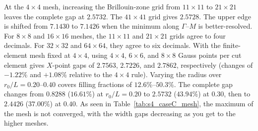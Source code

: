 At the $4\times4$ mesh, increasing the Brillouin-zone grid from $11\times11$ to $21\times21$ leaves the complete gap at $2.5732$. The $41\times41$ grid gives $2.5728$. The upper edge is shifted from $7.1430$ to $7.1426$ when the minimum along $\Gamma$--$M$ is better-resolved. For $8\times8$ and $16\times16$ meshes, the $11\times11$ and $21\times21$ grids agree to four decimals. For $32\times32$ and $64\times64$, they agree to six decimals. With the finite-element mesh fixed at $4\times4$, using $4\times4$, $6\times6$, and $8\times8$ Gauss points per cut element gives $X$-point gaps of $2.7563$, $2.7226$, and $2.7862$, respectively (changes of $-1.22\%$ and $+1.08\%$ relative to the $4\times4$ rule). Varying the radius over $r_0/L=0.20$--$0.40$ covers filling fractions of $12.6\%$--$50.3\%$. The complete gap changes from $0.8288$ ($16.61\%$) at $r_0/L=0.20$ to $2.5732$ ($43.94\%$) at $0.30$, then to $2.4426$ ($37.00\%$) at $0.40$. As seen in Table~\ref{tab:s4_caseC_mesh}, the maximum of the mesh is not converged, with the width gaps decreasing as you get to the higher meshes.


